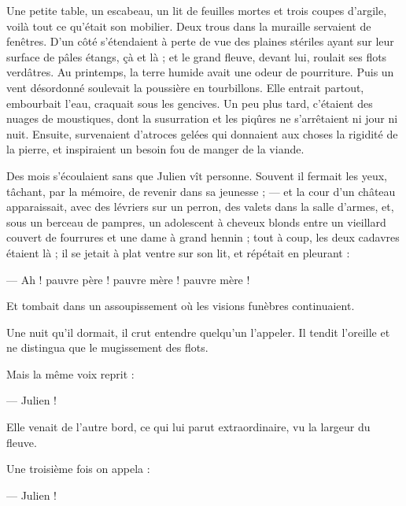 \documentclass[]{book}
\begin{document}
                Une petite table, un escabeau, un lit de feuilles mortes et trois coupes d'argile, voilà tout ce qu'était son mobilier. Deux trous dans la muraille servaient de fenêtres. D'un côté s'étendaient à perte de vue des plaines stériles ayant sur leur surface de pâles étangs, çà et là ; et le grand fleuve, devant lui, roulait ses flots verdâtres. Au printemps, la terre humide avait une odeur de pourriture. Puis un vent désordonné soulevait la poussière en tourbillons. Elle entrait partout, embourbait l'eau, craquait sous les gencives. Un peu plus tard, c'étaient des nuages de moustiques, dont la susurration et les piqûres ne s'arrêtaient ni jour ni nuit. Ensuite, survenaient d'atroces gelées qui donnaient aux choses la rigidité de la pierre, et inspiraient un besoin fou de manger de la viande.
                    
                Des mois s'écoulaient sans que Julien vît personne. Souvent il fermait les yeux, tâchant, par la mémoire, de revenir dans sa jeunesse ; — et la cour d'un château apparaissait, avec des lévriers sur un perron, des valets dans la salle d'armes, et, sous un berceau de pampres, un adolescent à cheveux blonds entre un vieillard couvert de fourrures et une dame à grand hennin ; tout à coup, les deux cadavres étaient là ; il se jetait à plat ventre sur son lit, et répétait en pleurant :
                    
                — Ah ! pauvre père ! pauvre mère ! pauvre mère !
                    
                Et tombait dans un assoupissement où les visions funèbres continuaient.
                    
                Une nuit qu'il dormait, il crut entendre quelqu'un l'appeler. Il tendit l'oreille et ne distingua que le mugissement des flots.
                    
                Mais la même voix reprit :
                    
                — Julien !
                    
                Elle venait de l'autre bord, ce qui lui parut extraordinaire, vu la largeur du fleuve.
                    
                Une troisième fois on appela :
                    
                — Julien !
                    
\end{document}
